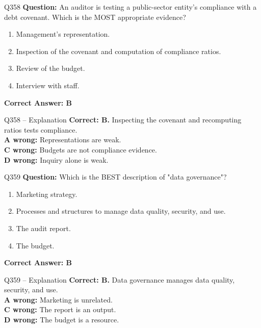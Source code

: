 \documentclass[aspectratio=169,10pt]{beamer}
\begin{document}
	\begin{frame}[t]{Q358}
		\small
		\textbf{Question:} An auditor is testing a public-sector entity's compliance with a debt covenant. Which is the MOST appropriate evidence?
		\begin{enumerate}[label=\Alph*.,itemsep=1pt,topsep=2pt]
			\item Management's representation.
			\item Inspection of the covenant and computation of compliance ratios.
			\item Review of the budget.
			\item Interview with staff.
		\end{enumerate}
		\vspace{4pt}
		\textbf{Correct Answer: B}
	\end{frame}
	
	\begin{frame}[t]{Q358 -- Explanation}
		\small
		\textbf{Correct: B.} Inspecting the covenant and recomputing ratios tests compliance. \\[4pt]
		\textbf{A wrong:} Representations are weak. \\[2pt]
		\textbf{C wrong:} Budgets are not compliance evidence. \\[2pt]
		\textbf{D wrong:} Inquiry alone is weak.
	\end{frame}
	
	\begin{frame}[t]{Q359}
		\small
		\textbf{Question:} Which is the BEST description of "data governance"?
		\begin{enumerate}[label=\Alph*.,itemsep=1pt,topsep=2pt]
			\item Marketing strategy.
			\item Processes and structures to manage data quality, security, and use.
			\item The audit report.
			\item The budget.
		\end{enumerate}
		\vspace{4pt}
		\textbf{Correct Answer: B}
	\end{frame}
	
	\begin{frame}[t]{Q359 -- Explanation}
		\small
		\textbf{Correct: B.} Data governance manages data quality, security, and use. \\[4pt]
		\textbf{A wrong:} Marketing is unrelated. \\[2pt]
		\textbf{C wrong:} The report is an output. \\[2pt]
		\textbf{D wrong:} The budget is a resource.
	\end{frame}
	
\end{document}
